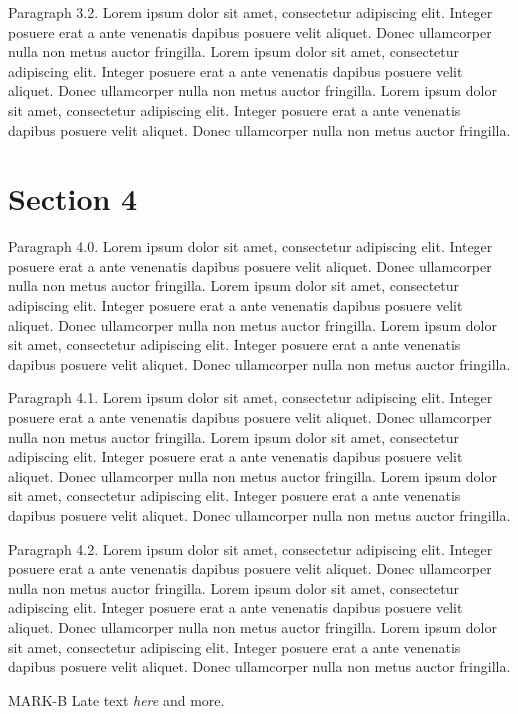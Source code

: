 \documentclass{article}
\begin{document}
Paragraph 3.2. Lorem ipsum dolor sit amet, consectetur adipiscing elit. Integer posuere erat a ante venenatis dapibus posuere velit aliquet. Donec ullamcorper nulla non metus auctor fringilla. Lorem ipsum dolor sit amet, consectetur adipiscing elit. Integer posuere erat a ante venenatis dapibus posuere velit aliquet. Donec ullamcorper nulla non metus auctor fringilla. Lorem ipsum dolor sit amet, consectetur adipiscing elit. Integer posuere erat a ante venenatis dapibus posuere velit aliquet. Donec ullamcorper nulla non metus auctor fringilla. 

\section{Section 4}
Paragraph 4.0. Lorem ipsum dolor sit amet, consectetur adipiscing elit. Integer posuere erat a ante venenatis dapibus posuere velit aliquet. Donec ullamcorper nulla non metus auctor fringilla. Lorem ipsum dolor sit amet, consectetur adipiscing elit. Integer posuere erat a ante venenatis dapibus posuere velit aliquet. Donec ullamcorper nulla non metus auctor fringilla. Lorem ipsum dolor sit amet, consectetur adipiscing elit. Integer posuere erat a ante venenatis dapibus posuere velit aliquet. Donec ullamcorper nulla non metus auctor fringilla. 

Paragraph 4.1. Lorem ipsum dolor sit amet, consectetur adipiscing elit. Integer posuere erat a ante venenatis dapibus posuere velit aliquet. Donec ullamcorper nulla non metus auctor fringilla. Lorem ipsum dolor sit amet, consectetur adipiscing elit. Integer posuere erat a ante venenatis dapibus posuere velit aliquet. Donec ullamcorper nulla non metus auctor fringilla. Lorem ipsum dolor sit amet, consectetur adipiscing elit. Integer posuere erat a ante venenatis dapibus posuere velit aliquet. Donec ullamcorper nulla non metus auctor fringilla. 

Paragraph 4.2. Lorem ipsum dolor sit amet, consectetur adipiscing elit. Integer posuere erat a ante venenatis dapibus posuere velit aliquet. Donec ullamcorper nulla non metus auctor fringilla. Lorem ipsum dolor sit amet, consectetur adipiscing elit. Integer posuere erat a ante venenatis dapibus posuere velit aliquet. Donec ullamcorper nulla non metus auctor fringilla. Lorem ipsum dolor sit amet, consectetur adipiscing elit. Integer posuere erat a ante venenatis dapibus posuere velit aliquet. Donec ullamcorper nulla non metus auctor fringilla. 

MARK-B Late text \emph{here} and more.
\end{document}

